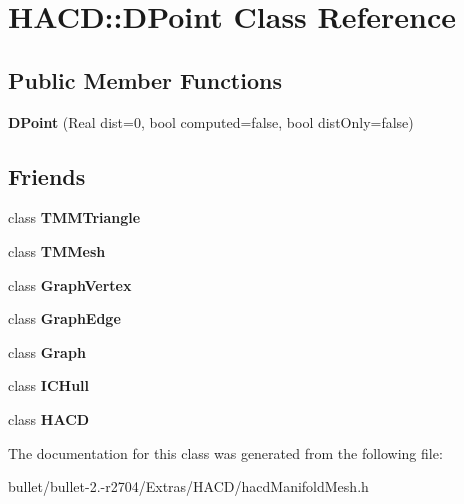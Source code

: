 \hypertarget{class_h_a_c_d_1_1_d_point}{\section{H\+A\+C\+D\+:\+:D\+Point Class Reference}
\label{class_h_a_c_d_1_1_d_point}
}
\subsection*{Public Member Functions}
\begin{DoxyCompactItemize}
\item 
\hypertarget{class_h_a_c_d_1_1_d_point_aade83a2c9bcc6ff80fa5952f46c8c68c}{{\bfseries D\+Point} (Real dist=0, bool computed=false, bool dist\+Only=false)}\label{class_h_a_c_d_1_1_d_point_aade83a2c9bcc6ff80fa5952f46c8c68c}

\end{DoxyCompactItemize}
\subsection*{Friends}
\begin{DoxyCompactItemize}
\item 
\hypertarget{class_h_a_c_d_1_1_d_point_ac66cabe598df0738b39a09449de0faad}{class {\bfseries T\+M\+M\+Triangle}}\label{class_h_a_c_d_1_1_d_point_ac66cabe598df0738b39a09449de0faad}

\item 
\hypertarget{class_h_a_c_d_1_1_d_point_a444d6b56620e89d598962bee57ddd380}{class {\bfseries T\+M\+Mesh}}\label{class_h_a_c_d_1_1_d_point_a444d6b56620e89d598962bee57ddd380}

\item 
\hypertarget{class_h_a_c_d_1_1_d_point_a8f525f61c613bd8083d8a87e97b620f2}{class {\bfseries Graph\+Vertex}}\label{class_h_a_c_d_1_1_d_point_a8f525f61c613bd8083d8a87e97b620f2}

\item 
\hypertarget{class_h_a_c_d_1_1_d_point_a84b8e7bc6d8fb2b88fbbea35ba045b9d}{class {\bfseries Graph\+Edge}}\label{class_h_a_c_d_1_1_d_point_a84b8e7bc6d8fb2b88fbbea35ba045b9d}

\item 
\hypertarget{class_h_a_c_d_1_1_d_point_afab89afd724f1b07b1aaad6bdc61c47a}{class {\bfseries Graph}}\label{class_h_a_c_d_1_1_d_point_afab89afd724f1b07b1aaad6bdc61c47a}

\item 
\hypertarget{class_h_a_c_d_1_1_d_point_af8c54a3b946020c72439a823fc62e570}{class {\bfseries I\+C\+Hull}}\label{class_h_a_c_d_1_1_d_point_af8c54a3b946020c72439a823fc62e570}

\item 
\hypertarget{class_h_a_c_d_1_1_d_point_ab3497bc7797561d0c79ecef2f462e43a}{class {\bfseries H\+A\+C\+D}}\label{class_h_a_c_d_1_1_d_point_ab3497bc7797561d0c79ecef2f462e43a}

\end{DoxyCompactItemize}


The documentation for this class was generated from the following file\+:\begin{DoxyCompactItemize}
\item 
bullet/bullet-\/2.-\/r2704/\+Extras/\+H\+A\+C\+D/hacd\+Manifold\+Mesh.\+h\end{DoxyCompactItemize}
